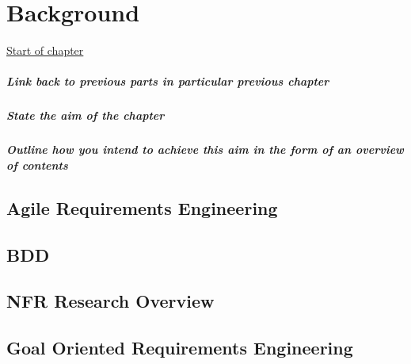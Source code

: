 \documentclass[dissertation]{softeng}
\begin{document}
\chapter{Background}
\label{ch:Background}
\underline{Start of chapter}
\paragraph{Link back to previous parts in particular previous chapter}
\paragraph{State the aim of the chapter}
\paragraph{Outline how you intend to achieve this aim in the form of an overview of contents}

\section{Agile Requirements Engineering}

\section{BDD}

\section{NFR Research Overview}

\section{Goal Oriented Requirements Engineering}
\end{document}
